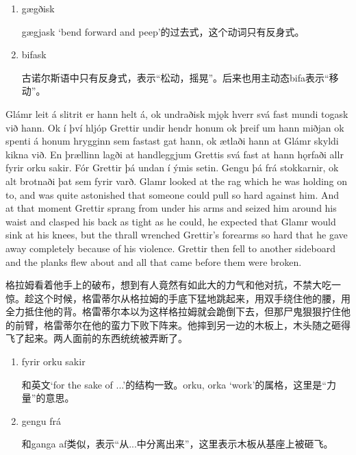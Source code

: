 \begin{grammar*}{}
    \begin{enumerate}[leftmargin=*]
        \item gægðisk

              gægjask `bend forward and peep'的过去式，这个动词只有反身式。

        \item bifask

              古诺尔斯语中只有反身式，表示“松动，摇晃”。后来也用主动态bifa表示“移动”。
    \end{enumerate}
\end{grammar*}
\begin{paracol}{2}
    Glámr leit á slitrit er hann helt á, ok undraðisk mjǫk hverr svá fast mundi togask við hann. Ok í því hljóp Grettir undir hendr honum ok þreif um hann miðjan ok spenti á honum hrygginn sem fastast gat hann, ok ætlaði hann at Glámr skyldi kikna við. En þrællinn lagði at handleggjum Grettis svá fast at hann hǫrfaði allr fyrir orku sakir. Fór Grettir þá undan í ýmis setin. Gengu þá frá stokkarnir, ok alt brotnaði þat sem fyrir varð.
    \switchcolumn
    Glamr looked at the rag which he was holding on to, and was quite astonished that someone could pull so hard against him. And at that moment Grettir sprang from under his arms and seized him around his waist and clasped his back as tight as he could, he expected that Glamr would sink at his knees, but the thrall wrenched Grettir's forearms so hard that he gave away completely because of his violence. Grettir then fell to another sideboard and the planks flew about and all that came before them were broken.
\end{paracol}
\begin{translation*}{}
    格拉姆看着他手上的破布，想到有人竟然有如此大的力气和他对抗，不禁大吃一惊。趁这个时候，格雷蒂尔从格拉姆的手底下猛地跳起来，用双手绕住他的腰，用全力抵住他的背。格雷蒂尔本以为这样格拉姆就会跪倒下去，但那尸鬼狠狠拧住他的前臂，格雷蒂尔在他的蛮力下败下阵来。他摔到另一边的木板上，木头随之砸得飞了起来。两人面前的东西统统被弄断了。
\end{translation*}
\begin{grammar*}{}
    \begin{enumerate}[leftmargin=*]
        \item fyrir orku sakir

              和英文`for the sake of ...'的结构一致。orku, orka `work'的属格，这里是“力量”的意思。

        \item gengu frá

              和ganga af类似，表示“从...中分离出来”，这里表示木板从基座上被砸飞。
    \end{enumerate}
\end{grammar*}
